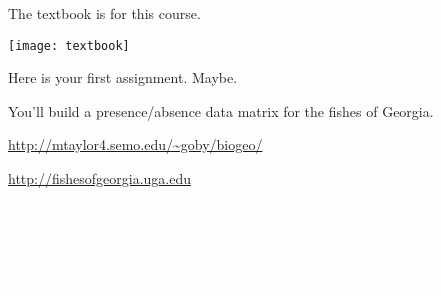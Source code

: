 \documentclass[t]{beamer}
\begin{document}
\begin{frame}[t,plain]{The textbook is  for this course.}
	\begin{center}
		\texttt{[image: textbook]}
	\end{center}
\end{frame}


{
\begin{frame}[t,plain]{Here is your first assignment. Maybe.}

	\hangpara You'll build a presence/absence data matrix for the fishes of Georgia.

	\hangpara \url{http://mtaylor4.semo.edu/~goby/biogeo/}
	
	\hangpara \url{http://fishesofgeorgia.uga.edu}
	
\end{frame}
}

{
\begin{frame}[b,plain]{\textcolor{white}{What is biogeography?}}

\end{frame}
}


{
\begin{frame}[t,plain]{\textcolor{white}{What explains the distribution of organisms living here?}}

	\hangpara\textcolor{white}{Consider ecological and geological time scales.}
\end{frame}
}

{
\begin{frame}[t,plain]
\end{frame}
}

{
\begin{frame}[t,plain]
\end{frame}
}

{
\begin{frame}[t,plain]
\end{frame}
}

{
\begin{frame}[t,plain]
\end{frame}
}
\end{document}
